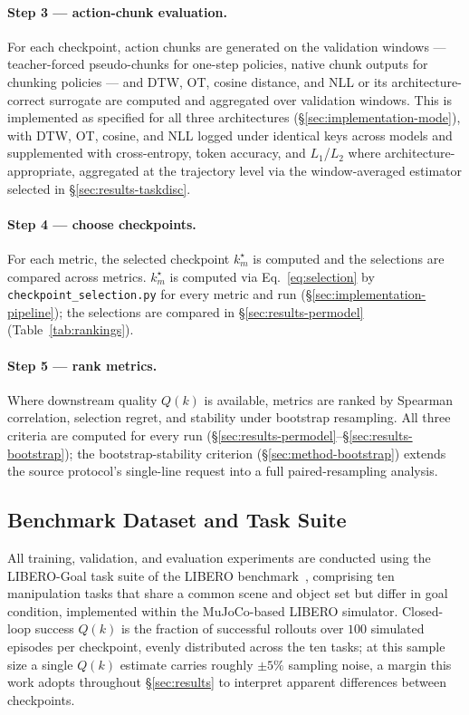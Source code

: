 \documentclass[english,12pt,a4paper,pdftex,elec,utf8]{aaltothesis}
\begin{document}
\paragraph{Step 3 --- action-chunk evaluation.} For each checkpoint, action chunks are generated on the validation windows --- teacher-forced pseudo-chunks for one-step policies, native chunk outputs for chunking policies --- and DTW, OT, cosine distance, and NLL or its architecture-correct surrogate are computed and aggregated over validation windows. This is implemented as specified for all three architectures (\S\ref{sec:implementation-mode}), with DTW, OT, cosine, and NLL logged under identical keys across models and supplemented with cross-entropy, token accuracy, and $L_1$/$L_2$ where architecture-appropriate, aggregated at the trajectory level via the window-averaged estimator selected in \S\ref{sec:results-taskdisc}.

\paragraph{Step 4 --- choose checkpoints.} For each metric, the selected checkpoint $k_m^\star$ is computed and the selections are compared across metrics. $k_m^\star$ is computed via Eq.~\ref{eq:selection} by \texttt{checkpoint\_selection.py} for every metric and run (\S\ref{sec:implementation-pipeline}); the selections are compared in \S\ref{sec:results-permodel} (Table~\ref{tab:rankings}).

\paragraph{Step 5 --- rank metrics.} Where downstream quality $Q(k)$ is available, metrics are ranked by Spearman correlation, selection regret, and stability under bootstrap resampling. All three criteria are computed for every run (\S\ref{sec:results-permodel}--\S\ref{sec:results-bootstrap}); the bootstrap-stability criterion (\S\ref{sec:method-bootstrap}) extends the source protocol's single-line request into a full paired-resampling analysis.


\subsection{Benchmark Dataset and Task Suite}
\label{sec:implementation-benchmark}

All training, validation, and evaluation experiments are conducted using the LIBERO-Goal task suite of the LIBERO benchmark~\cite{liu2023libero}, comprising ten manipulation tasks that share a common scene and object set but differ in goal condition, implemented within the MuJoCo-based LIBERO simulator. Closed-loop success \(Q(k)\) is the fraction of successful rollouts over \(100\) simulated episodes per checkpoint, evenly distributed across the ten tasks; at this sample size a single \(Q(k)\) estimate carries roughly \(\pm 5\%\) sampling noise, a margin this work adopts throughout \S\ref{sec:results} to interpret apparent differences between checkpoints.
\end{document}
